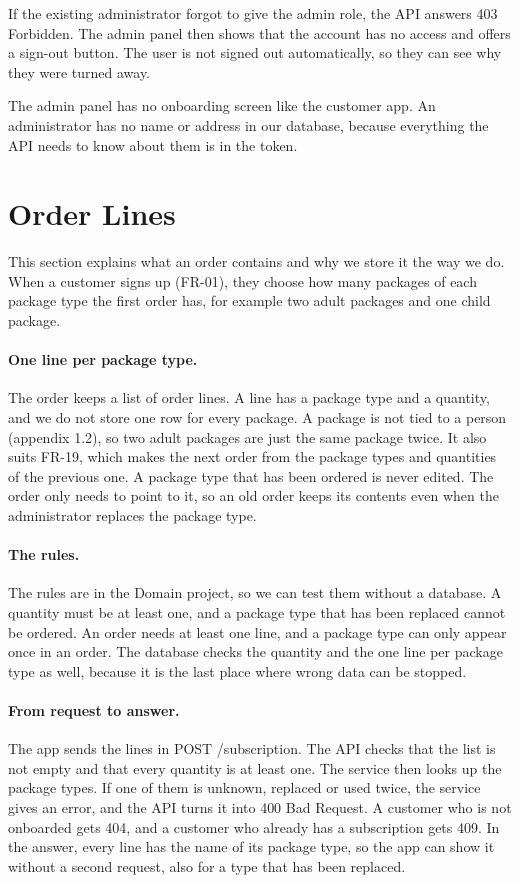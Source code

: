 \documentclass[a4paper,11pt]{article}
\begin{document}
If the existing administrator forgot to give the admin role, the API answers 403 Forbidden. The admin panel then shows that the account has no access and offers a sign-out button. The user is not signed out automatically, so they can see why they were turned away.

The admin panel has no onboarding screen like the customer app. An administrator has no name or address in our database, because everything the API needs to know about them is in the token.

\section{Order Lines}\label{sec:order-lines}
This section explains what an order contains and why we store it the way we do. When a customer signs up (FR-01), they choose how many packages of each package type the first order has, for example two adult packages and one child package.

\paragraph{One line per package type.} The order keeps a list of order lines. A line has a package type and a quantity, and we do not store one row for every package. A package is not tied to a person (appendix 1.2), so two adult packages are just the same package twice. It also suits FR-19, which makes the next order from the package types and quantities of the previous one. A package type that has been ordered is never edited. The order only needs to point to it, so an old order keeps its contents even when the administrator replaces the package type.

\paragraph{The rules.} The rules are in the Domain project, so we can test them without a database. A quantity must be at least one, and a package type that has been replaced cannot be ordered. An order needs at least one line, and a package type can only appear once in an order. The database checks the quantity and the one line per package type as well, because it is the last place where wrong data can be stopped.

\paragraph{From request to answer.} The app sends the lines in POST /subscription. The API checks that the list is not empty and that every quantity is at least one. The service then looks up the package types. If one of them is unknown, replaced or used twice, the service gives an error, and the API turns it into 400 Bad Request. A customer who is not onboarded gets 404, and a customer who already has a subscription gets 409. In the answer, every line has the name of its package type, so the app can show it without a second request, also for a type that has been replaced.
\end{document}
